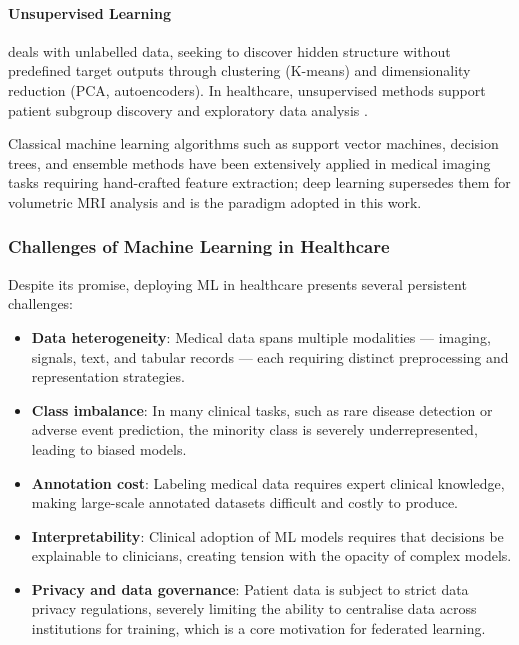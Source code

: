 \paragraph{Unsupervised Learning}
deals with unlabelled data, seeking to discover hidden structure without predefined
target outputs through clustering (K-means) and dimensionality reduction (PCA,
autoencoders).
In healthcare, unsupervised methods support patient subgroup discovery and
exploratory data analysis \cite{ibmmltypes}.

Classical machine learning algorithms such as support vector machines, decision
trees, and ensemble methods have been extensively applied in medical imaging tasks
requiring hand-crafted feature extraction;
deep learning supersedes them for volumetric MRI analysis and is the paradigm
adopted in this work.

\subsubsection{Challenges of Machine Learning in Healthcare}

Despite its promise, deploying ML in healthcare presents several persistent challenges:

\begin{itemize}
    \item \textbf{Data heterogeneity}: Medical data spans multiple modalities — imaging, 
    signals, text, and tabular records — each requiring distinct preprocessing and 
    representation strategies.
    
    \item \textbf{Class imbalance}: In many clinical tasks, such as rare disease detection 
    or adverse event prediction, the minority class is severely underrepresented, leading 
    to biased models.
    
    \item \textbf{Annotation cost}: Labeling medical data requires expert clinical 
    knowledge, making large-scale annotated datasets difficult and costly to produce.
    
    \item \textbf{Interpretability}: Clinical adoption of ML models requires that 
    decisions be explainable to clinicians, creating tension with the opacity of 
    complex models.
    
    \item \textbf{Privacy and data governance}: Patient data is subject to strict
    data privacy regulations, severely limiting the ability to centralise
    data across institutions for training, which is a core motivation for federated
    learning.
\end{itemize}

